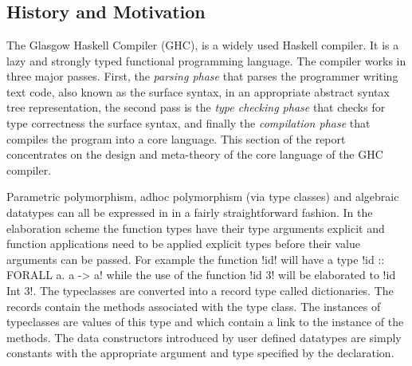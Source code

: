 \documentclass[manuscript,screen,nonacm]{acmart}
\begin{document}
\section{\SFC}\label{sec:sfc} %
\subsection{History and Motivation}
The Glasgow Haskell Compiler (GHC)\cite{ghc_2020}, is a widely used Haskell\cite{haskell_2010} compiler. It is a lazy and strongly typed functional programming language. The compiler works in three major passes. First, the \emph{parsing phase} that parses the programmer writing text code, also known as the surface syntax, in an appropriate abstract syntax tree representation, the second pass is the \emph{type checking phase} that checks for type correctness the surface syntax, and finally the \emph{compilation phase} that compiles the program into a core language. This section of the report concentrates on the design and meta-theory of the core language of the GHC compiler.

Parametric polymorphism, adhoc polymorphism (via type classes)\cite{hall_type_1994} and algebraic datatypes can all be expressed in \SF in a fairly straightforward fashion\cite{TODO}.  In the elaboration scheme the function types have their type arguments explicit and function applications need to be applied explicit types before their value arguments can be passed. For example the function !id! will have a type !id :: FORALL a. a -> a! while the use of the function !id 3! will be elaborated to !id Int 3!. The typeclasses are converted into a record type called dictionaries. The records contain the methods associated with the type class. The instances of typeclasses are values of this type and which contain a link to the instance of the methods. The data constructors introduced by user defined datatypes are simply constants with the appropriate argument and type specified by the declaration.
\end{document}
